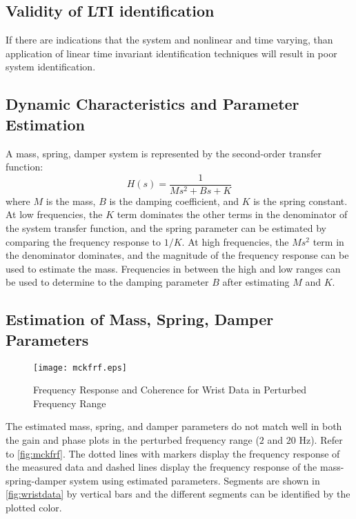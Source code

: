 \documentclass[11pt,a4paper]{article}
\begin{document}
\subsection{Validity of LTI identification}
If there are indications that the system and nonlinear and time varying, than
application of linear time invariant identification techniques will result in
poor system identification.

\subsection{Dynamic Characteristics and Parameter Estimation}
A mass, spring, damper system is represented by the second-order transfer
function:
\begin{equation*}
    H(s) = \frac{1}{Ms^2 + Bs + K}
\end{equation*}
where $M$ is the mass, $B$ is the damping coefficient, and $K$ is the spring
constant. At low frequencies, the $K$ term dominates the other terms in the
denominator of the system transfer function, and the spring parameter can be
estimated by comparing the frequency response to $1/K$. At high frequencies,
the $Ms^2$ term in the denominator dominates, and the magnitude of the
frequency response can be used to estimate the mass. Frequencies in between the
high and low ranges can be used to determine to the damping parameter $B$ after
estimating $M$ and $K$.

\subsection{Estimation of Mass, Spring, Damper Parameters}
\begin{figure}
    \centering
    \texttt{[image: mckfrf.eps]}
    \caption{Frequency Response and Coherence for Wrist Data in Perturbed
        Frequency Range}
    \label{fig:mckfrf}
\end{figure}
The estimated mass, spring, and damper parameters do not match well in both the
gain and phase plots in the perturbed frequency range ($2$ and $20$ Hz). Refer
to \autoref{fig:mckfrf}. The dotted lines with markers display the frequency
response of the measured data and dashed lines display the frequency response
of the mass-spring-damper system using estimated parameters. Segments are shown
in \autoref{fig:wristdata} by vertical bars and the different segments can be
identified by the plotted color.

\end{document}

